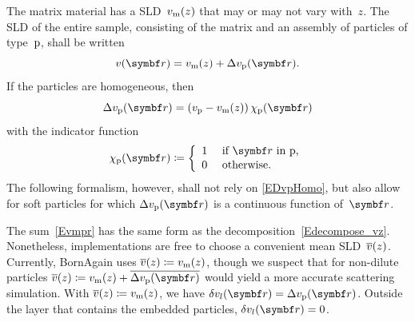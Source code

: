 The matrix material has a SLD~$v_\sm(z)$
that may or may not vary with~$z$.
The SLD of the entire sample,
consisting of the matrix and an assembly of particles of type~$\sp$,
shall be written
\begin{equation}\label{Evmpr}
  v(\r) = v_\sm(z) + \Delta v_\sp(\r).
\end{equation}
If the particles are homogeneous, then
\begin{equation}\label{EDvpHomo}
  \Delta v_\sp(\r) = \left(v_\sp-v_\sm(z)\right)\chi_\sp(\r)
\end{equation}
with the indicator function
\begin{equation}\label{EdefChiP}
  \chi_\sp(\r)\coloneqq\left\{\begin{array}{ll}
  1&\text{~if $\r$ in p,}\\[.2ex]
  0&\text{~otherwise.} \end{array}\right.
\end{equation}
%
%
The following formalism, however, shall not rely on \cref{EDvpHomo},
but also allow for soft particles for which $\Delta v_\sp(\r)$ is a continuous function of~$\r$.

The sum~\cref{Evmpr} has the same form as the decomposition~\cref{Edecompose_vz}.
Nonetheless, implementations are free to choose a convenient mean SLD~$\mv(z)$.
Currently, BornAgain uses $\mv(z)\coloneqq v_\sm(z)$,
though we suspect that for non-dilute particles
$\mv(z)\coloneqq v_\sm(z) + \overline{\Delta v_\sp(\r)}$ would yield
a more accurate scattering simulation.
With $\mv(z)\coloneqq v_\sm(z)$, we have
$\delta v_l(\r) = \Delta v_\sp(\r)$.
Outside the layer that contains the embedded particles,
$\delta v_l(\r)=0$.

